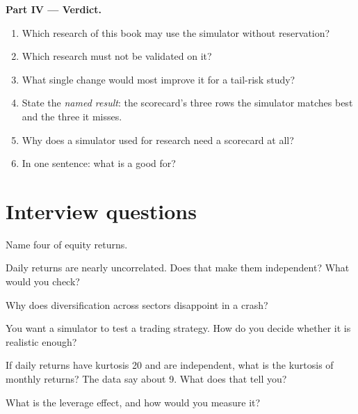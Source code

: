 \begin{problem}
\medskip\noindent\textbf{Part IV --- Verdict.}
\begin{enumerate}[resume]
\item Which research of this book may use the simulator without reservation?
\item Which research must not be validated on it?
\item What single change would most improve it for a tail-risk study?
\item State the \emph{named result}: the scorecard's three rows the simulator matches best and the three it misses.
\item Why does a simulator used for research need a scorecard at all?
\item In one sentence: what is a  good for?
\end{enumerate}
\end{problem}

\section{Interview questions}

\begin{interviewq}\label{iq:rs:stylised-facts-of-returns:1}
Name four  of equity returns.
\end{interviewq}

\begin{interviewq}\label{iq:rs:stylised-facts-of-returns:2}
Daily returns are nearly uncorrelated. Does that make them independent? What would you check?
\end{interviewq}

\begin{interviewq}\label{iq:rs:stylised-facts-of-returns:3}
Why does diversification across sectors disappoint in a crash?
\end{interviewq}

\begin{interviewq}\label{iq:rs:stylised-facts-of-returns:4}
You want a simulator to test a trading strategy. How do you decide whether it is realistic enough?
\end{interviewq}

\begin{interviewq}\label{iq:rs:stylised-facts-of-returns:5}
If daily returns have kurtosis 20 and are independent, what is the kurtosis of monthly returns? The data say about 9. What does that
tell you?
\end{interviewq}

\begin{interviewq}\label{iq:rs:stylised-facts-of-returns:6}
What is the leverage effect, and how would you measure it?
\end{interviewq}
